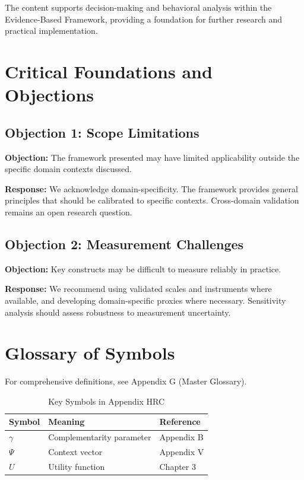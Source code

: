 The content supports decision-making and behavioral analysis within the
Evidence-Based Framework, providing a foundation for further research
and practical implementation.



\section{Critical Foundations and Objections}
\label{sec:hrc-foundations}

\subsection{Objection 1: Scope Limitations}

\textbf{Objection:} The framework presented may have limited applicability
outside the specific domain contexts discussed.

\textbf{Response:} We acknowledge domain-specificity. The framework provides
general principles that should be calibrated to specific contexts. Cross-domain
validation remains an open research question.

\subsection{Objection 2: Measurement Challenges}

\textbf{Objection:} Key constructs may be difficult to measure reliably in
practice.

\textbf{Response:} We recommend using validated scales and instruments where
available, and developing domain-specific proxies where necessary. Sensitivity
analysis should assess robustness to measurement uncertainty.



\section{Glossary of Symbols}
\label{sec:hrc-glossary}

For comprehensive definitions, see Appendix G (Master Glossary).

\begin{table}[htbp]
\centering
\caption{Key Symbols in Appendix HRC}
\begin{tabular}{lll}
\toprule
\textbf{Symbol} & \textbf{Meaning} & \textbf{Reference} \\
\midrule
$\gamma$ & Complementarity parameter & Appendix B \\
$\Psi$ & Context vector & Appendix V \\
$U$ & Utility function & Chapter 3 \\
\bottomrule
\end{tabular}
\end{table}


